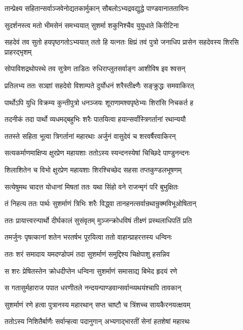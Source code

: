 \twolineshloka
{तान्प्रेक्ष्य सहितान्सर्वाञ्जवेनोद्यतकार्मुकान्}
{सौबलोऽभ्यद्रवद्युद्धे पाण्डवानाततायिनः}


\twolineshloka
{सुदर्शनस्त्व मतो भीमसेनं समभ्ययात्}
{सुशर्मा शकुनिश्चैव युयुधाते किरीटिना}


सहदेवं तव सुतो हयपृष्ठगतोऽभ्ययात्
\twolineshloka
{ततो हि यत्नतः क्षिप्रं तवं पुत्रो जनाधिप}
{प्रासेन सहदेवस्य शिरसि प्राहरद्भृशम्}


\twolineshloka
{सोपाविशद्रथोपस्थे तव सुत्रेण ताडितः}
{रुधिराप्लुतसर्वाङ्ग आशीविष इव श्वसन्}


\twolineshloka
{प्रतिलभ्य ततः सञ्ज्ञां सहदेवो विशाम्पते}
{दुर्योधनं शरैस्तीक्ष्णैः सङ्क्रुद्धः समवाकिरत्}


\twolineshloka
{पार्थोऽपि युधि विक्रम्य कुन्तीपुत्रो धनञ्जयः}
{शूराणामश्वपृष्ठेभ्यः शिरांसि निचकर्त ह}


\twolineshloka
{तदनीकं तदा पार्थो व्यधमद्बहुभिः शरैः}
{पातयित्वा हयान्सर्वांस्त्रिगर्तानां रथान्ययौ}


\twolineshloka
{ततस्ते सहिता भूत्वा त्रिगर्तानां महारथाः}
{अर्जुनं वासुदेवं च शरवर्षैरवाकिरन्}


\twolineshloka
{सत्यकर्माणमाक्षिप्य क्षुरप्रेण महायशाः}
{ततोऽस्य स्यन्दनस्येषां चिच्छिदे पाण्डुनन्दनः}


\twolineshloka
{शिलाशितेन च विभो क्षुरप्रेण महायशाः}
{शिरश्चिच्छेद सहसा तप्तकुण्डलभूषणम्}


\twolineshloka
{सत्येषुमथ चादत्त योधानां मिषतां ततः}
{यथा सिंहो वने राजन्मृगं परि बुभुक्षितः}


\twolineshloka
{तं निहत्य ततः पार्थः सुशर्माणं त्रिभिः शरैः}
{विद्ध्वा तानहनत्सर्वान्रथान्रुक्मविभूओषितान्}


\twolineshloka
{ततः प्रायात्त्वरन्पार्थो दीर्घकालं सुसंवृतम्}
{मुञ्जन्क्रोधविषं तीक्ष्णं प्रस्थलाधिपतिं प्रति}


\twolineshloka
{तमर्जुनः पृषत्कानां शतेन भरतर्षभ}
{पूरयित्वा ततो वाहान्प्राहरत्तस्य धन्विनः}


\twolineshloka
{ततः शरं समादाय यमदण्डोपमं तदा}
{सुशर्माणं समुद्दिश्य चिक्षेपाशु हसन्निव}


\twolineshloka
{स शरः प्रेषितस्तेन क्रोधदीप्तेन धन्विना}
{सुशर्माणं समासाद्य बिभेद हृदयं रणे}


\twolineshloka
{स गतासुर्महाराज पपात धरणीतले}
{नन्दयन्पाण्डवान्सर्वान्व्यथयंश्चापि तावकान्}


\twolineshloka
{सुशर्माणं रणे हत्वा पुत्रानस्य महारथान्}
{सप्त चाष्टौ च त्रिंशच्च सायकैरनयत्क्षयम्}


\twolineshloka
{ततोऽस्य निशितैर्बाणैः सर्वान्हत्वा पदानुगान्}
{अभ्यगाद्भारतीं सेनां हतशेषां महारथः}


